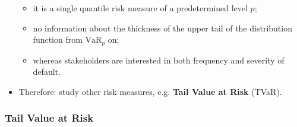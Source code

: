 \documentclass[]{book}
\begin{document}
\begin{itemize}
  \begin{itemize}
  \item
    it is a single quantile risk measure of a predetermined level \(p\);
  \item
    no information about the thickness of the upper tail of the
    distribution function from \(\text{VaR}_p\) on;
  \item
    whereas stakeholders are interested in both frequency and severity
    of default.
  \end{itemize}
\item
  Therefore: study other risk measures, e.g. \textbf{Tail Value at Risk}
  (TVaR).
\end{itemize}

\subsubsection{Tail Value at Risk}\label{tail-value-at-risk}
\end{document}
